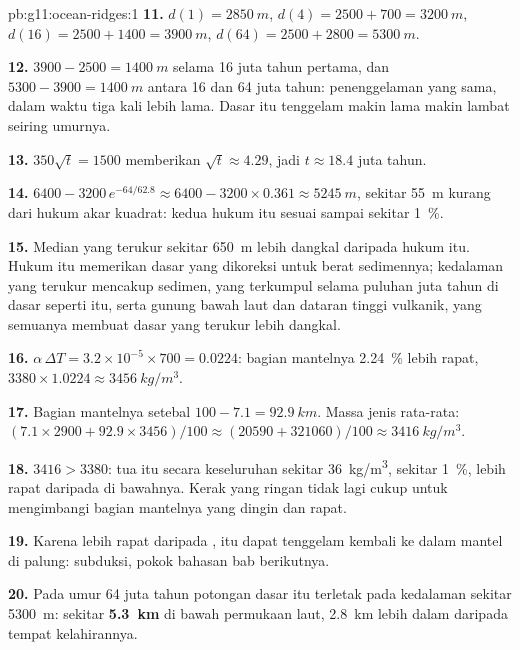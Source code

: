 \begin{solution}{pb:g11:ocean-ridges:1}
\textbf{11.} $d(1) = \qty{2850}{m}$, $d(4) = 2500 + 700 = \qty{3200}{m}$,
$d(16) = 2500 + 1400 = \qty{3900}{m}$, $d(64) = 2500 + 2800 = \qty{5300}{m}$.

\textbf{12.} $3900 - 2500 = \qty{1400}{m}$ selama 16 juta tahun pertama,
dan $5300 - 3900 = \qty{1400}{m}$ antara 16 dan 64 juta tahun: penenggelaman yang
sama, dalam waktu tiga kali lebih lama. Dasar itu tenggelam makin lama makin
lambat seiring umurnya.

\textbf{13.} $350\sqrt{t} = 1500$ memberikan $\sqrt{t} \approx 4.29$, jadi
$t \approx 18.4$ juta tahun.

\textbf{14.} $6400 - 3200\,e^{-64/62.8} \approx 6400 - 3200 \times 0.361
\approx \qty{5245}{m}$, sekitar \qty{55}{m} kurang dari hukum akar kuadrat: kedua
hukum itu sesuai sampai sekitar \qty{1}{\percent}.

\textbf{15.} Median yang terukur sekitar \qty{650}{m} lebih dangkal daripada
hukum itu. Hukum itu memerikan dasar yang dikoreksi untuk berat sedimennya;
kedalaman yang terukur mencakup sedimen, yang terkumpul selama puluhan juta tahun
di dasar seperti itu, serta gunung bawah laut dan dataran tinggi vulkanik, yang
semuanya membuat dasar yang terukur lebih dangkal.

\textbf{16.} $\alpha\,\Delta T = 3.2 \times 10^{-5} \times 700 = 0.0224$: bagian
mantelnya \qty{2.24}{\percent} lebih rapat,
$3380 \times 1.0224 \approx \qty{3456}{kg/m^3}$.

\textbf{17.} Bagian mantelnya setebal $100 - 7.1 = \qty{92.9}{km}$. Massa jenis
rata-rata: $(7.1 \times 2900 + 92.9 \times 3456)/100 \approx (20590 + 321060)/100
\approx \qty{3416}{kg/m^3}$.

\textbf{18.} $3416 > 3380$:  tua itu secara keseluruhan sekitar
\qty{36}{kg/m^3}, sekitar \qty{1}{\percent}, lebih rapat daripada  di
bawahnya. Kerak yang ringan tidak lagi cukup untuk mengimbangi bagian mantelnya
yang dingin dan rapat.

\textbf{19.} Karena lebih rapat daripada ,  itu dapat tenggelam
kembali ke dalam mantel di palung: subduksi, pokok bahasan bab berikutnya.

\textbf{20.} Pada umur 64 juta tahun potongan dasar itu terletak pada kedalaman
sekitar \qty{5300}{m}: sekitar \textbf{5.3~km} di bawah permukaan laut,
\qty{2.8}{km} lebih dalam daripada tempat kelahirannya.
\end{solution}
